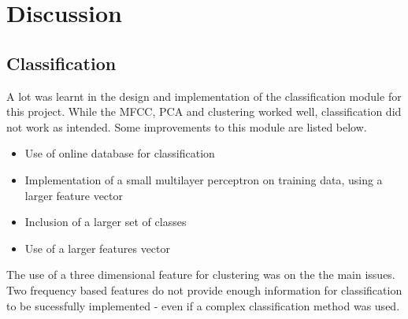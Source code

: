 \section{Discussion}

\subsection{Classification}
A lot was learnt in the design and implementation of the classification module for this project. While the MFCC, PCA and clustering worked well, classification did not work as intended. Some improvements to this module are listed below. 
\begin{itemize}
  \item Use of online database for classification
  \item Implementation of a small multilayer perceptron on training data, using a larger feature vector
  \item Inclusion of a larger set of classes
  \item Use of a larger features vector
\end{itemize}
The use of a three dimensional feature for clustering was on the the main issues. Two frequency based features do not provide enough information for classification to be sucessfully implemented - even if a complex classification method was used.
